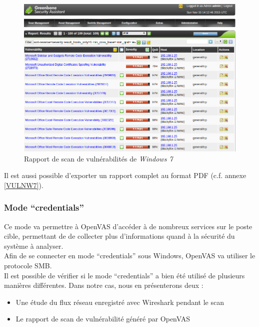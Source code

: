 \begin{figure}[H]
    \centering
    \includegraphics[width=\textwidth]{img/repW7.png}
    \caption{Rapport de scan de vulnérabilités de \textit{Windows 7}}
\end{figure}
Il est aussi possible d'exporter un rapport complet au format PDF (c.f. annexe \ref{VULNW7}).

\subsubsection{Mode \enquote{credentials}}
Ce mode va permettre à OpenVAS d'accéder à de nombreux services sur le poste cible, permettant de de collecter plus d'informations quand à la sécurité du système à analyser.\\
Afin de se connecter en mode \enquote{credentials} sous Windows, OpenVAS va utiliser le protocole SMB.\\
Il est possible de vérifier si le mode \enquote{credentials} a bien été utilisé de plusieurs manières différentes. Dans notre cas, nous en présenterons deux :
\begin{itemize}
 \item Une étude du flux réseau enregistré avec Wireshark pendant le scan
 \item Le rapport de scan de vulnérabilité généré par OpenVAS
\end{itemize}
